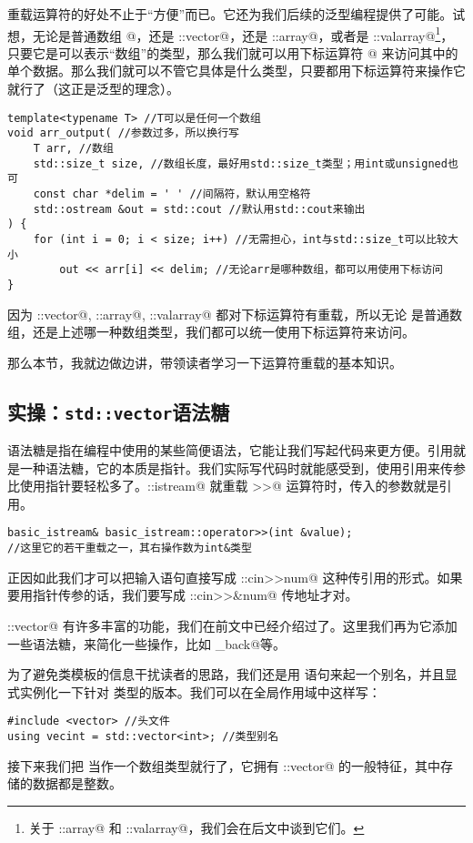 重载运算符的好处不止于``方便''而已。它还为我们后续的泛型编程提供了可能。试想，无论是普通数组 \lstinline@T[N]@，还是 \lstinline@std::vector@，还是 \lstinline@std::array@，或者是 \lstinline@std::valarray@\footnote{关于 \lstinline@std::array@ 和 \lstinline@std::valarray@，我们会在后文中谈到它们。}，只要它是可以表示``数组''的类型，那么我们就可以用下标运算符 \lstinline@[]@ 来访问其中的单个数据。那么我们就可以不管它具体是什么类型，只要都用下标运算符来操作它就行了（这正是泛型的理念）。
\begin{lstlisting}
template<typename T> //T可以是任何一个数组
void arr_output( //参数过多，所以换行写
    T arr, //数组
    std::size_t size, //数组长度，最好用std::size_t类型；用int或unsigned也可
    const char *delim = ' ' //间隔符，默认用空格符
    std::ostream &out = std::cout //默认用std::cout来输出
) {
    for (int i = 0; i < size; i++) //无需担心，int与std::size_t可以比较大小
        out << arr[i] << delim; //无论arr是哪种数组，都可以用使用下标访问
}
\end{lstlisting}
因为 \lstinline@std::vector@, \lstinline@std::array@, \lstinline@std::valarray@ 都对下标运算符有重载，所以无论 \lstinline@arr@ 是普通数组，还是上述哪一种数组类型，我们都可以统一使用下标运算符来访问。\par
那么本节，我就边做边讲，带领读者学习一下运算符重载的基本知识。\par
\subsection*{实操：\texttt{std::vector}语法糖}
语法糖是指在编程中使用的某些简便语法，它能让我们写起代码来更方便。引用就是一种语法糖，它的本质是指针。我们实际写代码时就能感受到，使用引用来传参比使用指针要轻松多了。\lstinline@std::istream@ 就重载 \lstinline@>>@ 运算符时，传入的参数就是引用。
\begin{lstlisting}
basic_istream& basic_istream::operator>>(int &value);
//这里它的若干重载之一，其右操作数为int&类型
\end{lstlisting}
正因如此我们才可以把输入语句直接写成 \lstinline@std::cin>>num@ 这种传引用的形式。如果要用指针传参的话，我们要写成 \lstinline@std::cin>>&num@ 传地址才对。\par
\lstinline@std::vector@ 有许多丰富的功能，我们在前文中已经介绍过了。这里我们再为它添加一些语法糖，来简化一些操作，比如 \lstinline@push_back@等。\par
为了避免类模板的信息干扰读者的思路，我们还是用 \lstinline@using@ 语句来起一个别名，并且显式实例化一下针对 \lstinline@int@ 类型的版本。我们可以在全局作用域中这样写：
\begin{lstlisting}
#include <vector> //头文件
using vecint = std::vector<int>; //类型别名
\end{lstlisting}
接下来我们把 \lstinline@vecint@ 当作一个数组类型就行了，它拥有 \lstinline@std::vector@ 的一般特征，其中存储的数据都是整数。\par
